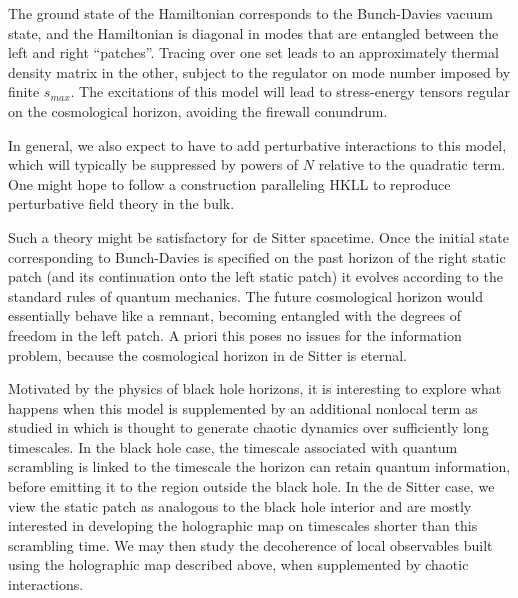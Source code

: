 \documentclass{brownthesis}
\begin{document}
The ground state of the Hamiltonian corresponds to the Bunch-Davies
vacuum state, and the Hamiltonian is diagonal in modes that are entangled
between the left and right ``patches''. Tracing over one set leads
to an approximately thermal density matrix in the other, subject to
the regulator on mode number imposed by finite $s_{max}$. The excitations
of this model will lead to stress-energy tensors regular on the cosmological
horizon, avoiding the firewall conundrum.

In general, we also expect to have to add perturbative interactions
to this model, which will typically be suppressed by powers of $N$
relative to the quadratic term. One might hope to follow a construction
paralleling HKLL \cite{Hamilton:2005ju,Hamilton:2006az} to reproduce
perturbative field theory in the bulk.

Such a theory might be satisfactory for de Sitter spacetime. Once
the initial state corresponding to Bunch-Davies is specified on the
past horizon of the right static patch (and its continuation onto
the left static patch) it evolves according to the standard rules
of quantum mechanics. The future cosmological horizon would essentially
behave like a remnant, becoming entangled with the degrees of freedom
in the left patch. A priori this poses no issues for the information
problem, because the cosmological horizon in de Sitter is eternal.

Motivated by the physics of black hole horizons, it is interesting
to explore what happens when this model is supplemented by an additional
nonlocal term as studied in \cite{Lowe:2016mhi,Lowe:2017ehz,Lowe:2019scv}
which is thought to generate chaotic dynamics over sufficiently long
timescales. In the black hole case, the timescale associated with
quantum scrambling is linked to the timescale the horizon can retain
quantum information, before emitting it to the region outside the
black hole. In the de Sitter case, we view the static patch as analogous
to the black hole interior and are mostly interested in developing
the holographic map on timescales shorter than this scrambling time.
We may then study the decoherence of local observables built using
the holographic map described above, when supplemented by chaotic
interactions.
\end{document}
